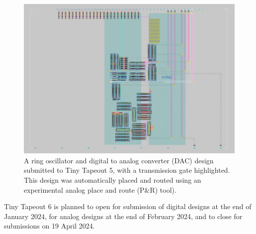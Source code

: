 \begin{figure}[!t]
\centering
\includegraphics[width=\columnwidth]{./Figs/tt05_transmission_gate.png}
\caption{A ring oscillator and digital to analog converter (DAC) design submitted to Tiny Tapeout 5, with a transmission gate highlighted. This design was automatically placed and routed using an experimental analog place and route (P\&R) tool).}
\label{fig:transmission_gate_TT05}
\end{figure}

Tiny Tapeout 6 is planned to open for submission of digital designs at the end of January 2024, for analog designs at the end of February 2024, and to close for submissions on 19 April 2024.
